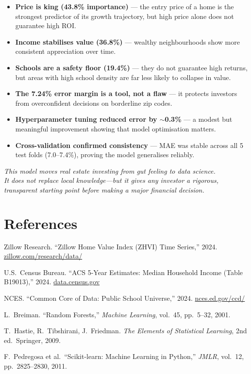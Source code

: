 \documentclass[12pt, a4paper]{article}
\begin{document}
\begin{itemize}
    \item \textbf{Price is king (43.8\% importance)} --- the entry price of a home is the strongest predictor of
          its growth trajectory, but high price alone does not guarantee high ROI.
    \item \textbf{Income stabilises value (36.8\%)} --- wealthy neighbourhoods show more consistent appreciation
          over time.
    \item \textbf{Schools are a safety floor (19.4\%)} --- they do not guarantee high returns, but areas with
          high school density are far less likely to collapse in value.
    \item \textbf{The 7.24\% error margin is a tool, not a flaw} --- it protects investors from overconfident
          decisions on borderline zip codes.
    \item \textbf{Hyperparameter tuning reduced error by $\sim$0.3\%} --- a modest but meaningful improvement
          showing that model optimisation matters.
    \item \textbf{Cross-validation confirmed consistency} --- MAE was stable across all 5 test folds (7.0--7.4\%),
          proving the model generalises reliably.
\end{itemize}

\begin{tcolorbox}[colback=rowblue, colframe=headerblue, arc=4pt]
\centering
\textit{This model moves real estate investing from gut feeling to data science.\\
It does not replace local knowledge---but it gives any investor a rigorous,\\
transparent starting point before making a major financial decision.}
\end{tcolorbox}

\section*{References}

\begin{enumerate}[label={[\arabic*]}]
    \item Zillow Research. ``Zillow Home Value Index (ZHVI) Time Series,'' 2024.
          \url{zillow.com/research/data/}
    \item U.S.\ Census Bureau. ``ACS 5-Year Estimates: Median Household Income (Table B19013),'' 2024.
          \url{data.census.gov}
    \item NCES. ``Common Core of Data: Public School Universe,'' 2024.
          \url{nces.ed.gov/ccd/}
    \item L.\ Breiman. ``Random Forests,'' \textit{Machine Learning}, vol.~45, pp.~5--32, 2001.
    \item T.\ Hastie, R.\ Tibshirani, J.\ Friedman. \textit{The Elements of Statistical Learning},
          2nd ed.\ Springer, 2009.
    \item F.\ Pedregosa et al.\ ``Scikit-learn: Machine Learning in Python,''
          \textit{JMLR}, vol.~12, pp.~2825--2830, 2011.
\end{enumerate}
\end{document}
